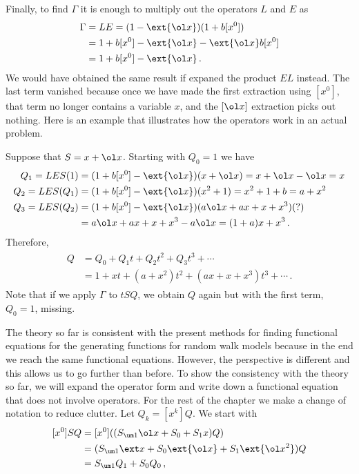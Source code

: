 Finally, to find $\Gamma$ it is enough to multiply out the operators $L$ and $E$ as
\begin{align}
\begin{split}
	\Gamma &= LE = (1 - \ext{\ol x})(1 + b[x^0]) \\
	&= 1 + b[x^0] - \ext{\ol x}-\ext{\ol x}b[x^0]\\
	&=1 + b[x^0] -\ext{\ol x}\,.
\end{split}
\end{align}
We would have obtained the same result if expaned the product $EL$ instead. The last term vanished  because once we have made the first extraction using $[x^0]$, that term no longer contains a variable $x$, and the $[\ol x]$ extraction picks out nothing. Here is an example that illustrates how the operators work in an actual problem.
\begin{example}Suppose that $S = x + \ol x$. Starting with $Q_0 = 1$ we have
\begin{align}
Q_1 = LES(1) &= (1+b[x^0]-\ext{\ol x})(x+\ol x) = x+\ol x-\ol x= x\\
Q_2 = LES(Q_1) &=  (1+b[x^0]-\ext{\ol x})(x^2+1) = x^2 + 1 + b = a + x^2\\
Q_3 = LES(Q_2) &=  (1+b[x^0]-\ext{\ol x})(a\ol x+ax+x+x^3) (?) \\
&= a\ol x+ax+x+x^3 -a\ol x= (1+a)x+x^3\,.
\end{align}
Therefore,
\begin{align}
\begin{split}
	Q &= Q_0 + Q_1 t +Q_2 t^2+ Q_3t^3 + \cdots\\
	&= 1 + xt + (a+x^2)t^2+(ax+x+x^3)t^3+ \cdots\,.
\end{split}
\end{align}
Note that if we apply $\Gamma$ to $tSQ$, we obtain $Q$ again but with the first term, $Q_0 = 1$, missing.
\end{example}
The theory so far is consistent with the present methods for finding functional equations for the generating functions for random walk models because in the end we reach the same functional equations. However, the perspective is different and this allows us to go further than before. To show the consistency with the theory so far, we will expand the operator form and write down a functional equation that does not involve operators. For the rest of the chapter we make a change of notation to reduce clutter. Let $Q_k = [x^k]Q$. We start with
\begin{align}
\begin{split}
	[x^0] SQ &= [x^0]((S_{\um 1}\ol x+S_0 +S_1 x)Q) \\
	& = (S_{\um 1}\ext x +S_0\ext{\ol x} +S_1 \ext{\ol x^2})Q\\
	& = S_{\um 1}Q_1 + S_0 Q_0\,,
\end{split}
\end{align}
